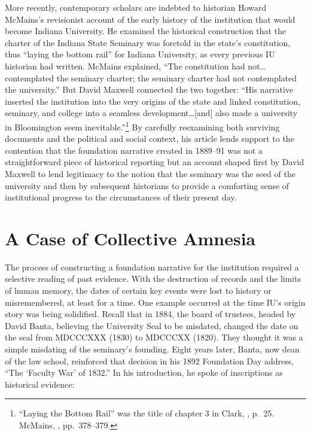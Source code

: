 \documentclass[
  american,
  letterpaper,
]{scrreprt}
\begin{document}
More recently, contemporary scholars are indebted to historian Howard
McMains's revisionist account of the early history of the institution
that would become Indiana University. He examined the historical
construction that the charter of the Indiana State Seminary was foretold
in the state's constitution, thus ``laying the bottom rail'' for Indiana
University, as every previous IU historian had written. McMains
explained, ``The constitution had not\ldots contemplated the seminary
charter; the seminary charter had not contemplated the university.'' But
David Maxwell connected the two together: ``His narrative inserted the
institution into the very origins of the state and linked constitution,
seminary, and college into a seamless development\ldots{[}and{]} also
made a university in Bloomington seem inevitable.''\footnote{``Laying
  the Bottom Rail'' was the title of chapter 3 in Clark,
  , p.~25.
  McMains, , pp.~378--379.} By carefully reexamining both surviving
documents and the political and social context, his article lends
support to the contention that the foundation narrative created in
1889--91 was not a straightforward piece of historical reporting but an
account shaped first by David Maxwell to lend legitimacy to the notion
that the seminary was the seed of the university and then by subsequent
historians to provide a comforting sense of institutional progress to
the circumstances of their present day.

\section{A Case of Collective
Amnesia}\label{a-case-of-collective-amnesia}

The process of constructing a foundation narrative for the institution
required a selective reading of past evidence. With the destruction of
records and the limits of human memory, the dates of certain key events
were lost to history or misremembered, at least for a time. One example
occurred at the time IU's origin story was being solidified. Recall that
in 1884, the board of trustees, headed by David Banta, believing the
University Seal to be misdated, changed the date on the seal from
MDCCCXXX (1830) to MDCCCXX (1820). They thought it was a simple
misdating of the seminary's founding. Eight years later, Banta, now dean
of the law school, reinforced that decision in his 1892 Foundation Day
address, ``The `Faculty War' of 1832.'' In his introduction, he spoke of
inscriptions as historical evidence:
\end{document}
